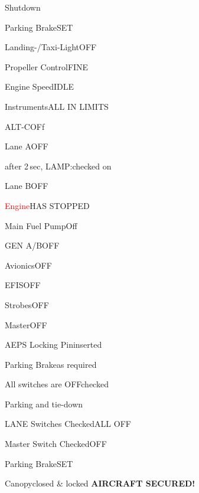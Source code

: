 \begin{checklist}{Shutdown}
  \item{Parking Brake}{SET}
  \item{Landing-/Taxi-Light}{OFF}
  \item{Propeller Control}{FINE}
  \item{Engine Speed}{IDLE}
  \item{Instruments}{ALL IN LIMITS}
  \item{ALT-C}{OFf}
  \item{Lane A}{OFF}
  \item{after 2\,sec, LAMP:}{checked on}
  \item{Lane B}{OFF}
  \item{\textcolor{red}{Engine}}{HAS STOPPED}
  \item{Main Fuel Pump}{Off}
  \item{GEN A/B}{OFF}
  \item{Avionics}{OFF}
  \item{EFIS}{OFF}
  \item{Strobes}{OFF}
  \item{Master}{OFF}
  \item{AEPS Locking Pin}{inserted}
  \item{Parking Brake}{as required}
  \item{All switches are OFF}{checked}
\end{checklist}

\begin{checklist}{Parking and tie-down}
  \item{LANE Switches Checked}{ALL OFF}
  \item{Master Switch Checked}{OFF}
  \item{Parking Brake}{SET}
  \item{Canopy}{closed \& locked}
  \textbf{AIRCRAFT SECURED!}
\end{checklist}


